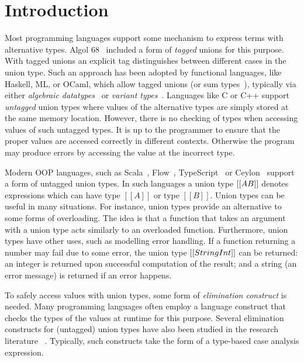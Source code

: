 \section{Introduction}
\label{sec:intro}

Most programming languages support some mechanism to express terms
with alternative types. Algol 68~\cite{van1969report,van2012revised} included a form of
\emph{tagged} unions for this purpose. With tagged unions
an explicit tag distinguishes between different cases in the
union type.
Such an approach has been adopted by functional languages, like Haskell, ML, or
OCaml, which allow tagged unions (or sum types~\cite{pierce2002types}), typically via
either \emph{algebraic datatypes}~\cite{hope} or \emph{variant types}~\cite{garrigue98}.
Languages like C or C++ support \emph{untagged} union types where
values of the alternative types are simply stored at the same memory
location. However, there is no checking of types when accessing values of
such untagged types. It is up to the programmer to ensure that the proper
values are accessed correctly in different contexts. Otherwise the
program may produce errors by accessing the value at the incorrect type.

Modern OOP languages, such as Scala~\cite{odersky2004overview}, Flow~\cite{chaudhuri2015flow},
TypeScript~\cite{bierman2014understanding} or Ceylon~\cite{king2013ceylon} support a form
of untagged union types.
In such languages a union type $[[A \/ B]]$ denotes expressions which can have type
$[[A]]$ or type $[[B]]$. Union types can be useful in many situations.
For instance, union types provide an alternative to some forms
of overloading. The idea is that a function that takes an argument
with a union type acts similarly to an overloaded function.
Furthermore, union types have other uses, such as modelling error handling.
If a function returning a number may fail due to some
error, the union type $[[String \/ Int]]$ can be returned: an integer
is returned upon successful computation of the result; and
a string (an error message) is returned if an error happens.

To safely access values with union types, some form of
\emph{elimination construct} is needed. Many programming languages often
employ a language construct that checks
the types of the values at runtime for this purpose.
Several elimination constructs for (untagged) union types
have also been studied in the research literature~
\cite{benzaken2003cduce,dunfield2014elaborating,castagna:settheoretic}.
Typically, such constructs take the form of a type-based case analysis
expression.


